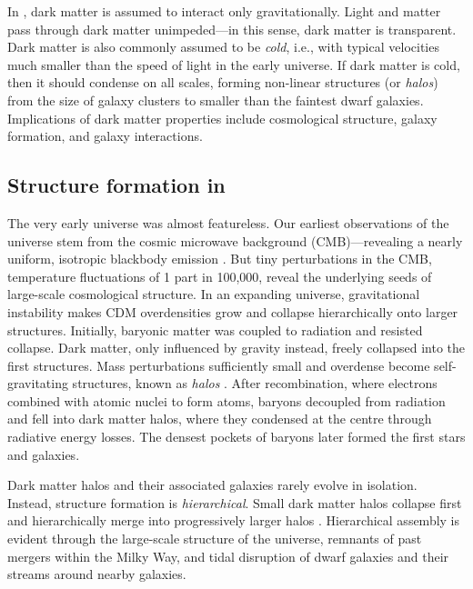 In \LCDM{}, dark matter is assumed to interact only gravitationally.
Light and matter pass through dark matter unimpeded---in this sense,
dark matter is transparent. Dark matter is also commonly assumed to be
\emph{cold}, i.e., with typical velocities much smaller than the speed
of light in the early universe. If dark matter is cold, then it should
condense on all scales, forming non-linear structures (or \emph{halos})
from the size of galaxy clusters to smaller than the faintest dwarf
galaxies. Implications of dark matter properties include cosmological
structure, galaxy formation, and galaxy interactions.

\subsection{\texorpdfstring{Structure formation in
\LCDM{}}{Structure formation in }}\label{structure-formation-in}

The very early universe was almost featureless. Our earliest
observations of the universe stem from the cosmic microwave background
(CMB)---revealing a nearly uniform, isotropic blackbody emission
\citep[e.g.,][]{ryden2016}. But tiny perturbations in the CMB,
temperature fluctuations of 1 part in 100,000, reveal the underlying
seeds of large-scale cosmological structure. In an expanding universe,
gravitational instability makes CDM overdensities grow and collapse
hierarchically onto larger structures. Initially, baryonic matter was
coupled to radiation and resisted collapse. Dark matter, only influenced
by gravity instead, freely collapsed into the first structures. Mass
perturbations sufficiently small and overdense become self-gravitating
structures, known as \emph{halos} \citep[e.g.,][]{galaxiesbook}. After
recombination, where electrons combined with atomic nuclei to form
atoms, baryons decoupled from radiation and fell into dark matter halos,
where they condensed at the centre through radiative energy losses. The
densest pockets of baryons later formed the first stars and galaxies.

Dark matter halos and their associated galaxies rarely evolve in
isolation. Instead, \LCDM{} structure formation is \emph{hierarchical}.
Small dark matter halos collapse first and hierarchically merge into
progressively larger halos
\citep[e.g.,][]{white+rees1978, blumenthal+1984, white+frenk1991}.
Hierarchical assembly is evident through the large-scale structure of
the universe, remnants of past mergers within the Milky Way, and tidal
disruption of dwarf galaxies and their streams around nearby galaxies.

